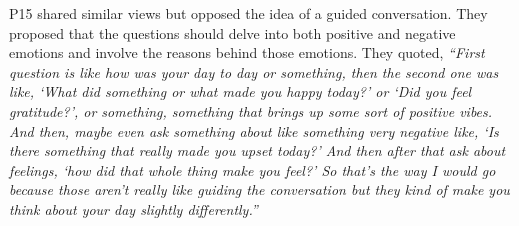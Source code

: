        
        P15 shared similar views but opposed the idea of a guided conversation. They proposed that the questions should delve into both positive and negative emotions and involve the reasons behind those emotions. They quoted,
        \textit{``First question is like how was your day to day or something, then the second one was like, `What did something or what made you happy today?' or `Did you feel gratitude?', or something, something that brings up some sort of positive vibes. And then, maybe even ask something about like something very negative like, `Is there something that really made you upset today?' 
        And then after that ask about feelings, 
        `how did that whole thing make you feel?'
        So that's the way I would go because those aren't really like guiding the conversation but they kind of make you think about your day slightly differently.''}
        
